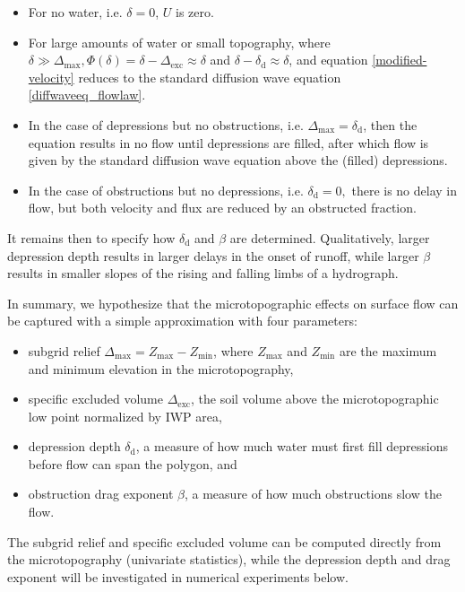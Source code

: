 \documentclass[review,11pt]{elsarticle}
\begin{document}
%
\begin{itemize}
\item For no water, i.e. $\delta = 0$, $U$ is zero.
\item For large amounts of water or small topography, where $\delta \gg \Delta_\text{max}, \Phi(\delta) = \delta - \Delta_\text{exc} \approx \delta$ and $\delta - \delta_\text{d} \approx \delta$, and equation \ref{modified-velocity} reduces to the standard diffusion wave equation \ref{diffwaveeq_flowlaw}.
\item In the case of depressions but no obstructions, i.e. $\Delta_\text{max} = \delta_\text{d}$, then the equation results in no flow until depressions are filled, after which flow is given by the standard diffusion wave equation above the (filled) depressions.
\item In the case of obstructions but no depressions, i.e. $\delta_\text{d} = 0,$ there is no delay in flow, but both velocity and flux are reduced by an obstructed fraction.\end{itemize}
%
It remains then to specify how $\delta_\text{d}$ and $\beta$ are determined.
Qualitatively, larger depression depth results in larger delays in the onset of runoff, while larger $\beta$ results in smaller slopes of the rising and falling limbs of a hydrograph.


In summary, we hypothesize that the microtopographic effects on surface flow can be captured with a simple approximation with four parameters:
%
\begin{itemize}
\item subgrid relief $\Delta_\text{max} = Z_\text{max} -   Z_\text{min}$, where  $Z_\text{max}$ and  $Z_\text{min}$ are the maximum and minimum elevation in the microtopography,
\item specific excluded volume $\Delta_\text{exc}$, the soil volume above the microtopographic low point normalized by IWP area,
\item depression depth $\delta_\text{d}$, a measure of how much water must first fill depressions before flow can span the polygon, and
\item obstruction drag exponent $\beta$, a measure of how much obstructions slow the flow.
\end{itemize}
%
The subgrid relief and specific excluded volume can be computed directly from the microtopography (univariate statistics), while the depression depth and drag exponent will be investigated in numerical experiments below.
\end{document}
